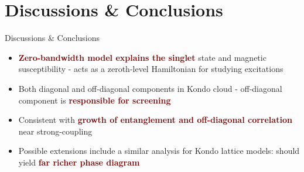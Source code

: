 \documentclass[aspectratio=169]{beamer}
\newcommand{\focus}[1]{\textcolor{maroon}{\textbf{#1}}}
\begin{document}
\section{Discussions \& Conclusions}
\begin{frame}[noframenumbering]{Discussions \& Conclusions}
	\begin{itemize}[<+-|alert@+>]
		\item \focus{Zero-bandwidth model explains the singlet} state and magnetic susceptibility - acts as a zeroth-level Hamiltonian for studying excitations\\[10pt]
		\item Both diagonal and off-diagonal components in Kondo cloud - off-diagonal component is \focus{responsible for screening}\\[10pt]
 		\item Consistent with \focus{growth of entanglement and off-diagonal correlation} near strong-coupling\\[10pt]
 		\item Possible extensions include a similar analysis for Kondo lattice models: should yield \focus{far richer phase diagram}\\[10pt]
	\end{itemize}
\end{frame}
\end{document}
